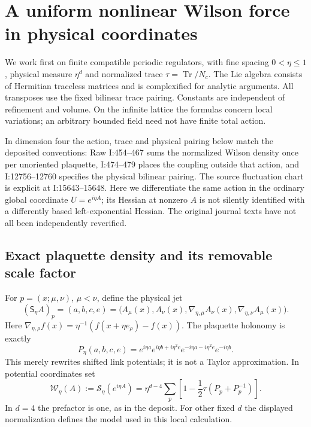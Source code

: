 
\section{A uniform nonlinear Wilson force in physical coordinates}
\label{wf-section}

We work first on finite compatible periodic regulators, with
fine spacing $0<\eta\le1$, physical measure $\eta^d$ and
normalized trace $\tau=\operatorname{Tr}/N_c$. The Lie algebra
consists of Hermitian traceless matrices and is complexified for
analytic arguments. All transposes use the fixed bilinear trace
pairing. Constants are independent of refinement and volume.
On the infinite lattice the formulas concern local variations;
an arbitrary bounded field need not have finite total action.

In dimension four the action, trace and physical pairing below
match the deposited conventions: Raw I:454--467 sums the
normalized Wilson density once per unoriented plaquette,
I:474--479 places the coupling outside that action, and
I:12756--12760 specifies the physical bilinear pairing.
The source fluctuation chart is explicit at I:15643--15648.
Here we differentiate the same action in the ordinary global
coordinate $U=e^{i\eta A}$; its Hessian at nonzero $A$ is not
silently identified with a differently based left-exponential
Hessian. The original journal texts have not all been
independently reverified.

\subsection{Exact plaquette density and its removable scale factor}

For $p=(x;\mu,\nu)$, $\mu<\nu$, define the physical jet
\begin{equation}\label{wf-jet}
 (\mathsf S_\eta A)_p=(a,b,c,e)
  =\bigl(A_\mu(x),A_\nu(x),
       \nabla_{\eta,\mu}A_\nu(x),
       \nabla_{\eta,\nu}A_\mu(x)\bigr).
\end{equation}
Here $\nabla_{\eta,\rho}f(x)
=\eta^{-1}(f(x+\eta e_\rho)-f(x))$. The plaquette
holonomy is exactly
\begin{equation}\label{wf-plaquette}
 P_\eta(a,b,c,e)
  =e^{i\eta a}e^{i\eta b+i\eta^2c}
                    e^{-i\eta a-i\eta^2e}e^{-i\eta b}.
\end{equation}
This merely rewrites shifted link potentials; it is not a
Taylor approximation. In potential coordinates set
\begin{equation}\label{wf-action}
 \mathcal W_\eta(A):=\mathcal S_\eta(e^{i\eta A})
   =\eta^{d-4}\sum_p
          \left[1-\frac12\tau(P_p+P_p^{-1})\right].
\end{equation}
In $d=4$ the prefactor is one, as in the deposit. For other
fixed $d$ the displayed normalization defines the model used
in this local calculation.

